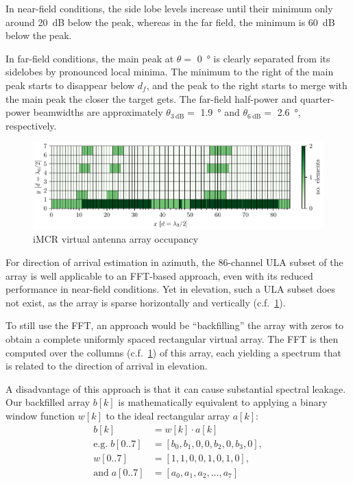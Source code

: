 In near-field conditions, the side lobe levels increase until their minimum only around \SI{20}{\dB} below the peak,
whereas in the far field, the minimum is \SI{60}{\dB} below the peak.

In far-field conditions, the main peak at $\theta =$ \SI{0}{\degree}
is clearly separated from its sidelobes by pronounced local minima.
The minimum to the right of the main peak starts to disappear below $d_f$,
and the peak to the right starts to merge with the main peak the closer the target gets.
The far-field half-power and quarter-power beamwidths are approximately
$\theta_{\SI{3}{\dB}}=$ \SI{1.9}{\degree} and $\theta_{\SI{6}{\dB}}=$ \SI{2.6}{\degree}, respectively. \\
\begin{figure}[h]
    \centering
    \includegraphics[width=\textwidth]{../figures/virt_array.pdf}
    \caption{iMCR virtual antenna array occupancy}
    \label{fig:virt_array}
\end{figure}

For direction of arrival estimation in azimuth, the 86-channel ULA subset of the array is well applicable to an FFT-based approach,
even with its reduced performance in near-field conditions.
Yet in elevation, such a ULA subset does not exist, as the array is sparse horizontally and vertically (c.f.\ \ref{fig:virt_array}).

To still use the FFT, an approach would be ``backfilling'' the array with zeros
to obtain a complete uniformly spaced rectangular virtual array.
The FFT is then computed over the collumns (c.f.\ \ref{fig:virt_array}) of this array,
each yielding a spectrum that is related to the direction of arrival in elevation.

A disadvantage of this approach is that it can cause substantial spectral leakage.
Our backfilled array $b[k] $ is mathematically equivalent
to applying a binary window function $w[k]$ to the ideal rectangular array $a[k]$:
\begin{align*}
    b[k]                   & =  w[k] \cdot  a[k]             \\
    \text{e.g.}\;  b[0..7] & = [b_0, b_1, 0,0,b_2,0,b_3,0 ], \\
    w[0..7]                & = [1,  1,0,0,1,0,1,0 ],         \\
    \text{and}\; a[0..7]   & = [a_0,a_1,a_2,\dots,a_7]
\end{align*}


